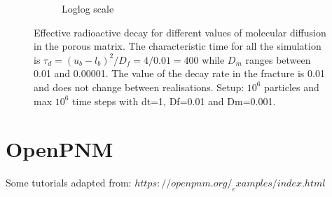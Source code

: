 \documentclass{article}
\begin{document}
\begin{figure}[htbp]
\begin{subfigure}[b]{0.48\textwidth}
        \caption{Loglog scale}
    \end{subfigure}
    \caption{Effective radioactive decay for different values of molecular diffusion in the porous matrix. The characteristic time for all the simulation is $\tau_d=(u_b-l_b)^2/D_f=4/0.01=400$ while $D_m$ ranges between 0.01 and 0.00001. The value of the decay rate in the fracture is 0.01 and does not change between realisations. Setup: $10^6$ particles and max $10^6$ time steps with dt=1, Df=0.01 and Dm=0.001.}
    \label{fig:KeffVsDm}
\end{figure}

\FloatBarrier  %
\section{OpenPNM}
Some tutorials adapted from: $https://openpnm.org/_examples/index.html$
\end{document}
